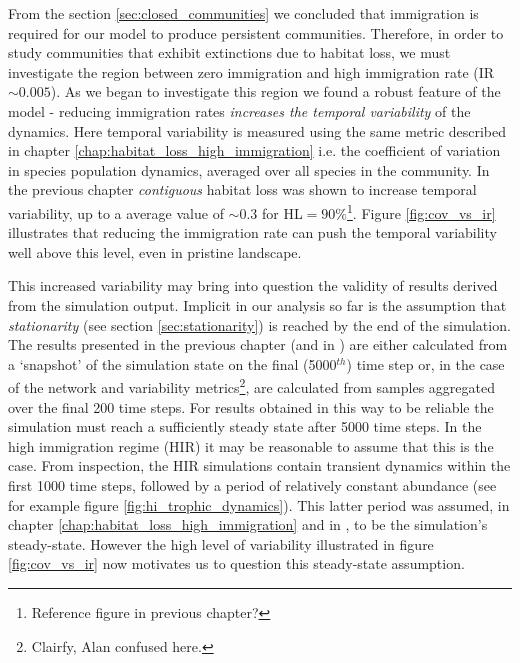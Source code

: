 From the section \ref{sec:closed_communities} we concluded that immigration is required for our model to produce persistent communities. Therefore, in order to study communities that exhibit extinctions due to habitat loss, we must investigate the region between zero immigration and high immigration rate (IR$\sim 0.005$). As we began to investigate this region we found a robust feature of the model - reducing immigration rates \emph{increases the temporal variability} of the dynamics. Here temporal variability is measured using the same metric described in chapter \ref{chap:habitat_loss_high_immigration} i.e. the coefficient of variation in species population dynamics, averaged over all species in the community. In the previous chapter \emph{contiguous} habitat loss was shown to increase temporal variability, up to a average value of $\sim 0.3$ for HL$=90\%$\footnote{Reference figure in previous chapter?}. Figure \ref{fig:cov_vs_ir} illustrates that reducing the immigration rate can push the temporal variability well above this level, even in pristine landscape. 


This increased variability may bring into question the validity of results derived from the simulation output. Implicit in our analysis so far is the assumption that \emph{stationarity} (see section \ref{sec:stationarity}) is reached by the end of the simulation. The results presented in the previous chapter (and in \cite{lurgi2015effects}) are either calculated from a `snapshot' of the simulation state on the final (5000$^{th}$) time step or, in the case of the network and variability metrics\footnote{Clairfy, Alan confused here.}, are calculated from samples aggregated over the final 200 time steps. For results obtained in this way to be reliable the simulation must reach a sufficiently steady state after 5000 time steps. In the high immigration regime (HIR) it may be reasonable to assume that this is the case. From inspection, the HIR simulations contain transient dynamics within the first 1000 time steps, followed by a period of relatively constant abundance (see for example figure \ref{fig:hi_trophic_dynamics}). This latter period was assumed, in chapter \ref{chap:habitat_loss_high_immigration} and in \cite{lurgi2015effects}, to be the simulation's steady-state. However the high level of variability illustrated in figure \ref{fig:cov_vs_ir} now motivates us to question this steady-state assumption. 

